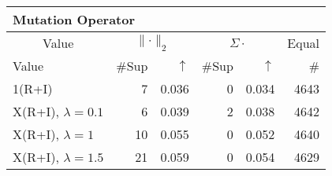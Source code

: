 \begin{center}
\renewcommand{\tabcolsep}{4pt}
\renewcommand{\arraystretch}{1.1}
\begin{customnormal}
\begin{tabular}{lrrrrr}
\multicolumn{6}{l}{Mutation Operator}\\
\toprule
\multicolumn{1}{c}{Value} & \multicolumn{2}{c}{$\lVert \cdot \rVert_2$} & \multicolumn{2}{c}{$\Sigma \cdot$} & \multicolumn{1}{c}{Equal} \\ 
\cmidrule(lr){1-1} \cmidrule(lr){2-3} \cmidrule(lr){4-5}  \cmidrule(lr){6-6}
Value & \#Sup & $\uparrow$ & \#Sup & $\uparrow$ & \# \\ 
\midrule
1(R+I) & 7 & 0.036 & 0 & 0.034 & 4643 \\ 
X(R+I), $\lambda=0.1$ & 6 & 0.039 & 2 & 0.038 & 4642 \\ 
X(R+I), $\lambda=1$ & 10 & 0.055 & 0 & 0.052 & 4640 \\ 
X(R+I), $\lambda=1.5$ & 21 & 0.059 & 0 & 0.054 & 4629 \\ 
\bottomrule
\end{tabular}


\end{customnormal}
\end{center}
